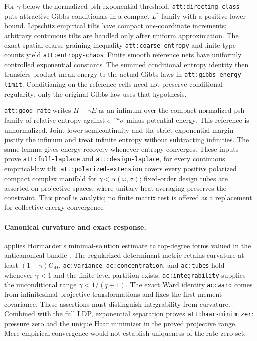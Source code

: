 For $\gamma$ below the normalized-psh exponential threshold,
\texttt{att:directing-class} puts attractive Gibbs conditionals in a
compact $L^r$ family with a positive lower bound. Lipschitz empirical
tilts have compact one-coordinate increments; arbitrary continuous
tilts are handled only after uniform approximation. The exact spatial
coarse-graining inequality \texttt{att:coarse-entropy} and finite type
counts yield \texttt{att:entropy-chaos}. Finite smooth reference nets
have uniformly controlled exponential constants. The summed conditional
entropy identity then transfers product mean energy to the actual
Gibbs laws in \texttt{att:gibbs-energy-limit}. Conditioning on the
reference cells need not preserve conditional regularity; only the
original Gibbs law uses that hypothesis.

\texttt{att:good-rate} writes $H-\gamma E$ as an infimum over the
compact normalized-psh family of relative entropy against
$e^{-\gamma u}\sigma$ minus potential energy. This reference is
unnormalized. Joint lower semicontinuity and the strict exponential
margin justify the infimum and treat infinite entropy without subtracting
infinities. The same lemma gives energy recovery whenever entropy
converges. These inputs prove \texttt{att:full-laplace} and
\texttt{att:design-laplace}, for every continuous empirical-law tilt.
\texttt{att:polarized-extension} covers every positive polarized compact
complex manifold for $\gamma<\alpha(\omega,\sigma)$; fixed-order design
tubes are asserted on projective spaces, where unitary heat averaging
preserves the constraint. This proof is analytic; no finite matrix test
is offered as a replacement for collective energy convergence.

\paragraph{Canonical curvature and exact response.}
 applies H\"ormander's
minimal-solution estimate to top-degree forms valued in the
anticanonical bundle \citep{Hormander1965}. The regularized determinant
metric retains curvature at least $(1-\gamma)G_M$.
\texttt{ac:variance}, \texttt{ac:concentration}, and \texttt{ac:tubes}
hold whenever $\gamma<1$ and the finite-level partition exists;
\texttt{ac:integrability} supplies the unconditional range
$\gamma<1/(q+1)$. The exact Ward identity \texttt{ac:ward}
comes from infinitesimal projective transformations and fixes the
first-moment covariance. These assertions must distinguish integrability
from curvature. Combined with the full LDP, exponential separation
proves \texttt{att:haar-minimizer}: pressure zero and the unique Haar
minimizer in the proved projective range. Mere empirical convergence
would not establish uniqueness of the rate-zero set.


